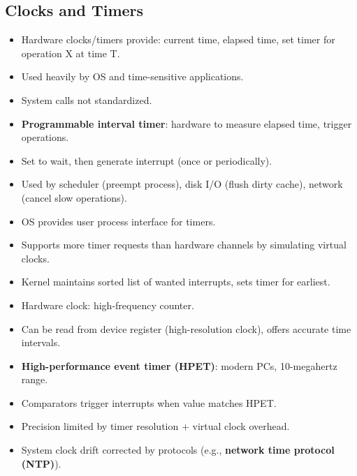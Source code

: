\subsection{Clocks and Timers}
\begin{itemize}
    \item Hardware clocks/timers provide: current time, elapsed time, set timer for operation X at time T.
    \item Used heavily by OS and time-sensitive applications.
    \item System calls not standardized.
    \item \textbf{Programmable interval timer}: hardware to measure elapsed time, trigger operations.
    \item Set to wait, then generate interrupt (once or periodically).
    \item Used by scheduler (preempt process), disk I/O (flush dirty cache), network (cancel slow operations).
    \item OS provides user process interface for timers.
    \item Supports more timer requests than hardware channels by simulating virtual clocks.
    \item Kernel maintains sorted list of wanted interrupts, sets timer for earliest.
    \item Hardware clock: high-frequency counter.
    \item Can be read from device register (high-resolution clock), offers accurate time intervals.
    \item \textbf{High-performance event timer (HPET)}: modern PCs, 10-megahertz range.
    \item Comparators trigger interrupts when value matches HPET.
    \item Precision limited by timer resolution + virtual clock overhead.
    \item System clock drift corrected by protocols (e.g., \textbf{network time protocol (NTP)}).
\end{itemize}

